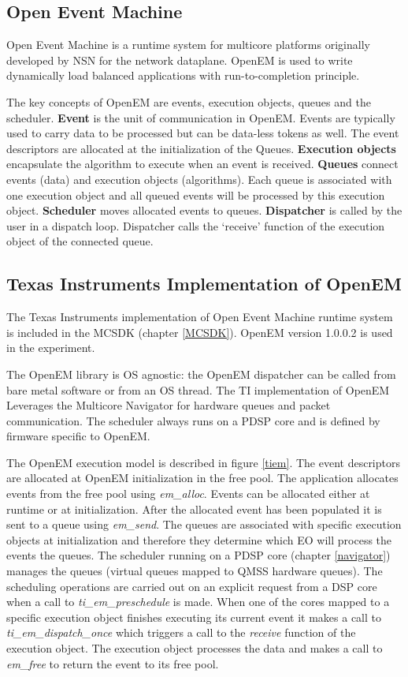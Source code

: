 \subsection{Open Event Machine}
Open Event Machine is a runtime system for multicore platforms originally developed by NSN for the network dataplane. OpenEM is used to write dynamically load balanced applications with run-to-completion principle.

The key concepts of OpenEM are events, execution objects, queues and the scheduler. \textbf{Event} is the unit of communication in OpenEM. Events are typically used to carry data to be processed but can be data-less tokens as well. The event descriptors are allocated at the initialization of the Queues. \textbf{Execution objects} encapsulate the algorithm to execute when an event is received. \textbf{Queues} connect events (data) and execution objects (algorithms). Each queue is associated with one execution object and all queued events will be processed by this execution object. \textbf{Scheduler} moves allocated events to queues. \textbf{Dispatcher} is called by the user in a dispatch loop. Dispatcher calls the ‘receive’ function of the execution object of the connected queue.

\subsection{Texas Instruments Implementation of OpenEM}
The Texas Instruments implementation of Open Event Machine runtime system is included in the MCSDK (chapter \ref{MCSDK}). OpenEM version 1.0.0.2 is used in the experiment.

The OpenEM library is OS agnostic: the OpenEM dispatcher can be called from bare metal software or from an OS thread. The TI implementation of OpenEM Leverages the Multicore Navigator for hardware queues and packet communication. The scheduler always runs on a PDSP core and is defined by firmware specific to OpenEM.

The OpenEM execution model is described in figure \ref{tiem}. The event descriptors are allocated at OpenEM initialization in the free pool. The application allocates events from the free pool using \textit{em\_alloc}. Events can be allocated either at runtime or at initialization. After the allocated event has been populated it is sent to a queue using \textit{em\_send}. The queues are associated with specific execution objects at initialization and therefore they determine which EO will process the events the queues. The scheduler running on a PDSP core (chapter \ref{navigator}) manages the queues (virtual queues mapped to QMSS hardware queues). The scheduling operations are carried out on an explicit request from a DSP core when a call to \textit{ti\_em\_preschedule} is made. When one of the cores mapped to a specific execution object finishes executing its current event it makes a call to \textit{ti\_em\_dispatch\_once} which triggers a call to the \textit{receive} function of the execution object. The execution object processes the data and makes a call to \textit{em\_free} to return the event to its free pool.

